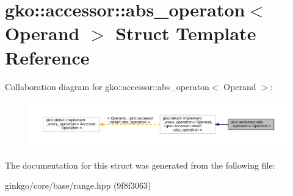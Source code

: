 \hypertarget{structgko_1_1accessor_1_1abs__operaton}{}\section{gko\+:\+:accessor\+:\+:abs\+\_\+operaton$<$ Operand $>$ Struct Template Reference}
\label{structgko_1_1accessor_1_1abs__operaton}


Collaboration diagram for gko\+:\+:accessor\+:\+:abs\+\_\+operaton$<$ Operand $>$\+:
\nopagebreak
\begin{figure}[H]
\begin{center}
\leavevmode
\includegraphics[width=350pt]{structgko_1_1accessor_1_1abs__operaton__coll__graph}
\end{center}
\end{figure}


The documentation for this struct was generated from the following file\+:\begin{DoxyCompactItemize}
\item 
ginkgo/core/base/range.\+hpp (9f8f3063)\end{DoxyCompactItemize}
